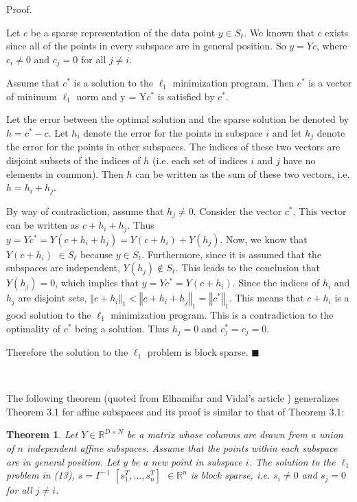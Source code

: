\documentclass{article}
\newcommand{\R}{\mathbb{R}}
\newtheorem{theorem}{Theorem}[section]
\begin{document}
Proof. 

Let $c$ be a sparse representation of the data point $y \in S_\ell$. We known that $c$ exists since all of the points in every subspace are in general position. So $y = Yc$, where $c_i \neq 0$ and $c_j = 0$ for all $j \neq i$. 

Assume that $c^*$ is a solution to the $\ell_1$ minimization program. Then $c^*$ is a vector of minimum $\ell_1$ norm and y = Y$c^*$ is satisfied by $c^*$. 

Let the error between the optimal solution and the sparse solution be denoted by $h = c^*-c$. Let $h_i$ denote the error for the points in subspace $i$ and let $h_j$ denote the error for the points in other subspaces. The indices of these two vectors are disjoint subsets of the indices of $h$ (i.e. each set of indices $i$ and $j$ have no elements in common). Then $h$ can be written as the sum of these two vectors, i.e. $h = h_i+h_j$.

By way of contradiction, assume that $h_j \neq 0$. Consider the vector $c^*$. This vector can be written as $c + h_i + h_j$. Thus $y = Yc^* = Y(c + h_i + h_j) = Y(c + h_i) + Y(h_j)$. Now, we know that $Y(c + h_i)$ $\in S_\ell$ because $y \in S_\ell$. Furthermore, since it is assumed that the subspaces are independent, $Y(h_j) \not\in S_\ell$. This leads to the conclusion that $Y(h_j) = 0$, which implies that $y = Yc^* = Y(c + h_i)$. Since the indices of $h_i$ and $h_j$ are disjoint sets, $\left\Vert c + h_i \right\Vert_1 < \left\Vert c + h_i + h_j \right\Vert_1 = \left\Vert c^* \right\Vert_1$. This means that $c + h_i$ is a good solution to the $\ell_1$ minimization program. This is a contradiction to the optimality of $c^*$ being a solution. Thus $h_j=0$ and $c_j^* = c_j = 0$.

Therefore the solution to the $\ell_1$ problem is block sparse. $\blacksquare$ \cite{SSC-CVPR09-Ehsan}

\ 

The following theorem (quoted from Elhamifar and Vidal's article \cite{SSC-CVPR09-Ehsan}) generalizes Theorem 3.1 for affine subspaces and its proof is similar to that of Theorem 3.1:

\begin{theorem}
Let $Y \in \R^{D \times N}$ be a matrix whose columns are drawn from a union of $n$ independent affine subspaces. Assume that the points within each subspace are in general position. Let $y$ be a new point in subspace $i$. The solution to the $\ell_1$ problem in (13),  $s = \Gamma^{-1}$ $\left[ s_1^T, \dots, s_n^T \right]$ $\in \R^n$ is block sparse, i.e. $s_i \neq 0$ and $s_j = 0$ for all $j \neq i$. \cite{SSC-CVPR09-Ehsan}
\end{theorem}
\end{document}
